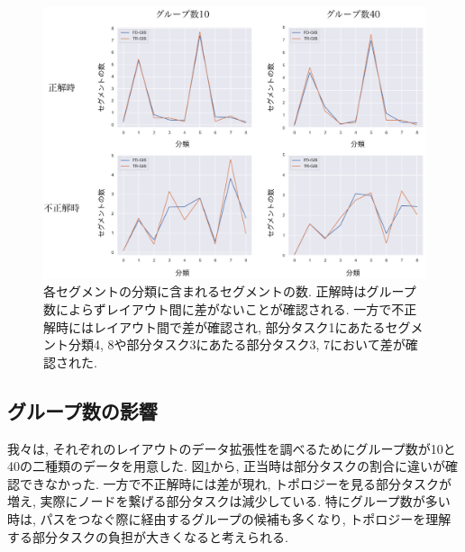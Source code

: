 \documentclass{kuee}
\begin{document}
\begin{figure}[t]
  \begin{center}
  \includegraphics[width=15cm]{./images/taxonomy-result.png}
  \caption{各セグメントの分類に含まれるセグメントの数. 正解時はグループ数によらずレイアウト間に差がないことが確認される. 一方で不正解時にはレイアウト間で差が確認され, 部分タスク1にあたるセグメント分類4, 8や部分タスク3にあたる部分タスク3, 7において差が確認された. \label{fig:taxonomy-result}}
  \end{center}
\end{figure}


\subsection{グループ数の影響}
我々は, それぞれのレイアウトのデータ拡張性を調べるためにグループ数が10と40の二種類のデータを用意した.
図\ref{fig:taxonomy-result}から, 正当時は部分タスクの割合に違いが確認できなかった.
一方で不正解時には差が現れ, トポロジーを見る部分タスクが増え, 実際にノードを繋げる部分タスクは減少している.
特にグループ数が多い時は, パスをつなぐ際に経由するグループの候補も多くなり, トポロジーを理解する部分タスクの負担が大きくなると考えられる.
\end{document}
